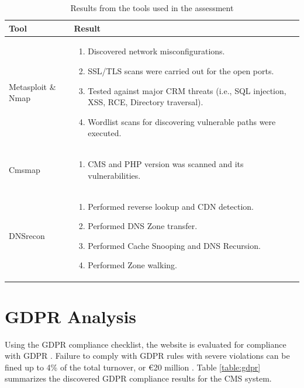 \begingroup
\centering
\setlength{\tabcolsep}{6.5pt} %
\renewcommand{\arraystretch}{1.8} %
\begin{longtable}{ |p{5cm}| p{10cm} |}
\caption{Results from the tools used in the assessment}
    \label{table:tools}
\hline
\rowcolor{grey!15}
\textbf{Tool}  & \textbf{Result}\\
\hline
Metasploit \& Nmap &  
\vspace{-\baselineskip}
\begin{enumerate}
    \item Discovered network misconfigurations.
    \item SSL/TLS scans were carried out for the open ports.
    \item Tested against major CRM threats (i.e., SQL injection, XSS, RCE, Directory traversal).
    \item Wordlist scans for discovering vulnerable paths were executed.
\end{enumerate}\\
\hline
Cmsmap &  
\vspace{-\baselineskip}
\begin{enumerate}
    \item CMS and PHP version was scanned and its vulnerabilities.
\end{enumerate}\\
\hline
DNSrecon &  
\vspace{-\baselineskip}
\begin{enumerate}
    \item Performed reverse lookup and CDN detection.
    \item Performed DNS Zone transfer.
    \item Performed Cache Snooping and DNS Recursion.
    \item Performed Zone walking.
\end{enumerate}\\
\hline
\end{longtable}
\endgroup

\section{GDPR Analysis}
Using the GDPR compliance checklist, the website is evaluated for compliance with GDPR \citep{gdpr_checklist}. Failure to comply with GDPR rules with severe violations can be fined up to 4\% of the total turnover, or €20 million \citep[p.~32]{eu_fines}. Table \ref{table:gdpr} summarizes the discovered GDPR compliance results for the CMS system.



